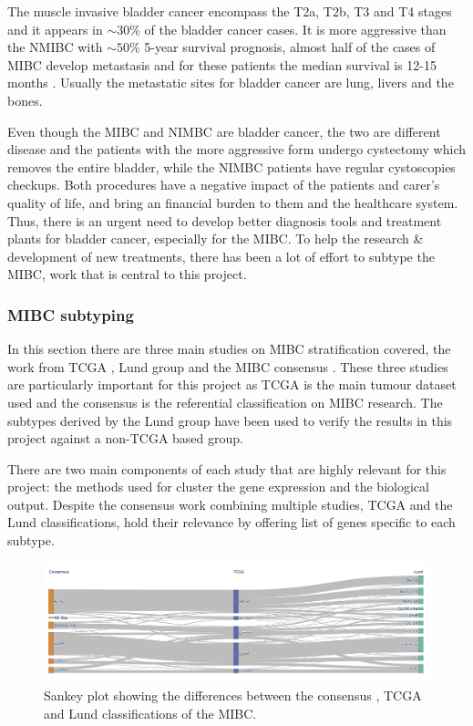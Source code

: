 The muscle invasive bladder cancer encompass the T2a, T2b, T3 and T4 stages and it appears in $\sim30\%$ of the bladder cancer cases. It is more aggressive than the NMIBC with $\sim50\%$ 5-year survival prognosis, almost half of the cases of MIBC develop metastasis and for these patients the median survival is 12-15 months \cite{Knowles2015-mu}. Usually the metastatic sites for bladder cancer are lung, livers and the bones.

Even though the MIBC and NIMBC are bladder cancer, the two are different disease and the patients with the more aggressive form undergo cystectomy which removes the entire bladder, while the NIMBC patients have regular cystoscopies checkups. Both procedures have a negative impact of the patients and carer's quality of life, and bring an financial burden to them and the healthcare system. Thus, there is an urgent need to develop better diagnosis tools and treatment plants for bladder cancer, especially for the MIBC. To help the research \& development of new treatments, there has been a lot of effort to subtype the MIBC, work that is central to this project.

\subsubsection{MIBC subtyping} \label{s:lit:subtypes_mibc}

In this section there are three main studies on MIBC stratification covered, the work from TCGA \citet{Robertson2017-mg}, Lund group \cite{Marzouka2018-ge} and the MIBC consensus \cite{Kamoun2020-tj}. These three studies are particularly important for this project as TCGA is the main tumour dataset used and the consensus is the referential classification on MIBC research. The subtypes derived by the Lund group have been used to verify the results in this project against a non-TCGA based group.

There are two main components of each study that are highly relevant for this project: the methods used for cluster the gene expression and the biological output. Despite the consensus work combining multiple studies, TCGA and the Lund classifications, hold their relevance by offering list of genes specific to each subtype. 

\begin{figure}[!htb]   
\centering
\includegraphics[width=1.0\textwidth,height=1.0\textheight,keepaspectratio]{Sections/Lit_review/Resources/classifier_differences.png}
  \caption{Sankey plot showing the differences between the consensus \citet{Kamoun2020-tj}, TCGA \citet{Robertson2017-mg} and Lund \citet{Marzouka2018-ge} classifications of the MIBC.}
\label{fig:lit:classifier_comp}
\end{figure}

